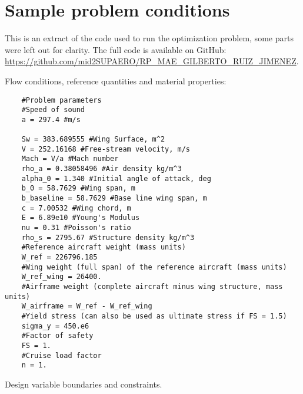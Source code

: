 \section{Sample problem conditions}
\label{sec:sampleprob}
This is an extract of the code used to run the optimization problem, some parts were left out for clarity. The full code is available on GitHub: \url{https://github.com/mid2SUPAERO/RP_MAE_GILBERTO_RUIZ_JIMENEZ}. 

Flow conditions, reference quantities and material properties:
\begin{lstlisting}
    #Problem parameters
    #Speed of sound
    a = 297.4 #m/s

    Sw = 383.689555 #Wing Surface, m^2
    V = 252.16168 #Free-stream velocity, m/s
    Mach = V/a #Mach number
    rho_a = 0.38058496 #Air density kg/m^3
    alpha_0 = 1.340 #Initial angle of attack, deg
    b_0 = 58.7629 #Wing span, m
    b_baseline = 58.7629 #Base line wing span, m
    c = 7.00532 #Wing chord, m
    E = 6.89e10 #Young's Modulus
    nu = 0.31 #Poisson's ratio
    rho_s = 2795.67 #Structure density kg/m^3
    #Reference aircraft weight (mass units)
    W_ref = 226796.185
    #Wing weight (full span) of the reference aircraft (mass units)
    W_ref_wing = 26400.
    #Airframe weight (complete aircraft minus wing structure, mass units)
    W_airframe = W_ref - W_ref_wing
    #Yield stress (can also be used as ultimate stress if FS = 1.5)
    sigma_y = 450.e6
    #Factor of safety
    FS = 1.
    #Cruise load factor
    n = 1.
\end{lstlisting}
Design variable boundaries and constraints.
